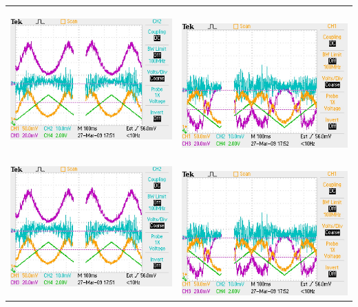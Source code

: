 \documentclass[11pt]{article}
\begin{document}
\begin{tabular}{ll}
\includegraphics[width=85mm, height=50mm]{zscanRefBeam.JPG}&\
\includegraphics[width=85mm, height=50mm]{zscanLensBeam.JPG}\\
\includegraphics[width=85mm]{zscanRefBeam.JPG}&\
\includegraphics[width=85mm]{zscanLensBeam.JPG}
\end{tabular}
\end{document}
